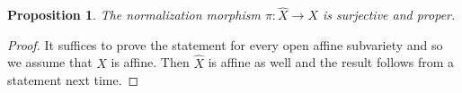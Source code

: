 \documentclass{article}
\theoremstyle{plain}
\newtheorem{prop}[thm]{Proposition}
\theoremstyle{definition}
\theoremstyle{remark}
\begin{document}
\begin{prop}
    The normalization morphism $\pi:\hat X\to X$ is surjective and proper.
\end{prop}
\begin{proof}
    It suffices to prove the statement for every open affine subvariety and
    so we assume that $X$ is affine. Then $\hat X$ is affine as well and the
    result follows from a statement next time.
\end{proof}
\end{document}
